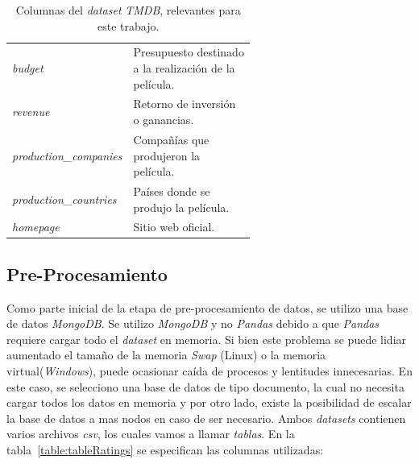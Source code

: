 \documentclass[11pt,a4paper,twoside]{thesis}
\begin{document}
\begin{table}[!htb]
\begin{tabular}{l | p{0.6\linewidth}}
		\textit{budget}                           & Presupuesto destinado a la realización de la película.                                \\
		\textit{revenue}                          & Retorno de inversión o ganancias.                                                     \\
		\textit{production\_companies}            & Compañías que produjeron la película.                                                 \\
		\textit{production\_countries}            & Países donde se produjo la película.                                                  \\
		\textit{homepage}                         & Sitio web oficial.                                                                    \\

		\hline
	\end{tabular}
	\caption{
		Columnas del \textit{dataset} \textit{TMDB}, relevantes para este trabajo.
	}
	\label{table:tmdbColumns}
\end{table}

\clearpage

\subsection{Pre-Procesamiento}

Como parte inicial de la etapa de pre-procesamiento de datos, se utilizo una
base de datos \textit{MongoDB}. Se utilizo \textit{MongoDB} y no
\textit{Pandas} debido a que \textit{Pandas} requiere cargar todo el
\textit{dataset} en memoria. Si bien este problema se puede lidiar aumentado el
tamaño de la memoria \textit{Swap} (Linux) o la memoria
virtual(\textit{Windows}), puede ocasionar caída de procesos y lentitudes
innecesarias. En este caso, se selecciono una base de datos de tipo documento,
la cual no necesita cargar todos los datos en memoria y por otro lado, existe
la posibilidad de escalar la base de datos a mas nodos en caso de ser
necesario. Ambos \textit{datasets} contienen varios archivos \textit{csv}, los
cuales vamos a llamar \textit{tablas}. En la tabla~\ref{table:tableRatings} se
especifican las columnas utilizadas:
\end{document}
